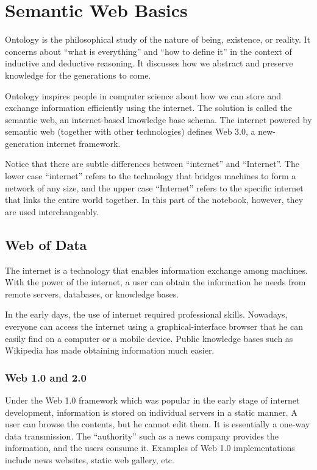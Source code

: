 \chapter{Semantic Web Basics} \label{ch:briefintrosemanticweb}

Ontology is the philosophical study of the nature of being, existence, or reality. It concerns about ``what is everything'' and ``how to define it'' in the context of inductive and deductive reasoning. It discusses how we abstract and preserve knowledge for the generations to come.

Ontology inspires people in computer science about how we can store and exchange information efficiently using the internet. The solution is called the semantic web, an internet-based knowledge base schema. The internet powered by semantic web (together with other technologies) defines Web 3.0, a new-generation internet framework.

Notice that there are subtle differences between ``internet'' and ``Internet''. The lower case ``internet'' refers to the technology that bridges machines to form a network of any size, and the upper case ``Internet'' refers to the specific internet that links the entire world together. In this part of the notebook, however, they are used interchangeably.

\section{Web of Data}

The internet is a technology that enables information exchange among machines. With the power of the internet, a user can obtain the information he needs from remote servers, databases, or knowledge bases.

In the early days, the use of internet required professional skills. Nowadays, everyone can access the internet using a graphical-interface browser that he can easily find on a computer or a mobile device. Public knowledge bases such as Wikipedia has made obtaining information much easier.

\subsection{Web 1.0 and 2.0}

Under the Web 1.0 framework which was popular in the early stage of internet development, information is stored on individual servers in a static manner. A user can browse the contents, but he cannot edit them. It is essentially a one-way data transmission. The ``authority'' such as a news company provides the information, and the users consume it. Examples of Web 1.0 implementations include news websites, static web gallery, etc.

